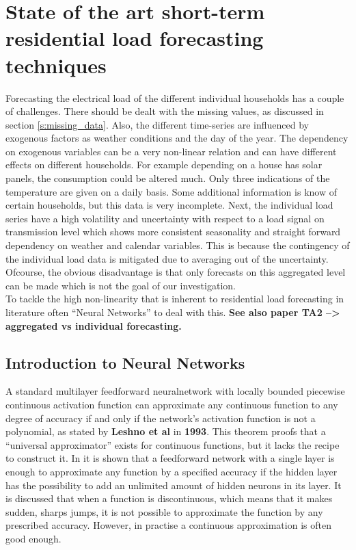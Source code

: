 \chapter{State of the art short-term residential load forecasting techniques}
\label{cha:State of the art short-term residential load forecasting techniques}
Forecasting the electrical load of the different individual households has a couple of challenges. There should be dealt with the missing values, as discussed in section \ref{s:missing_data}. Also, the different time-series are influenced by exogenous factors as weather conditions and the day of the year. The dependency on exogenous variables can be a very non-linear relation and can have different effects on different households. For example depending on a house has solar panels, the consumption could be altered much. Only three indications of the temperature are given on a daily basis. Some additional information is know of certain households, but this data is very incomplete. Next, the individual load series have a high volatility and uncertainty with respect to a load signal on transmission level which shows more consistent seasonality and straight forward dependency on weather and calendar variables. This is because the contingency of the individual load data is mitigated due to averaging out of the uncertainty. Ofcourse, the obvious disadvantage is that only forecasts on this aggregated level can be made which is not the goal of our investigation.\\ To tackle the high non-linearity that is inherent to residential load forecasting in literature often ``Neural Networks'' to deal with this.
\textbf{See also paper TA2 --> aggregated vs individual forecasting.}

\section{Introduction to Neural Networks}
A  standard multilayer feedforward neuralnetwork with locally bounded piecewise continuous activation function can approximate any continuous function to any degree of accuracy if and only if the network's activation function is not a polynomial, as stated by \textbf{Leshno et al} in \textbf{1993}. This theorem proofs that a ``universal approximator'' exists for continuous functions, but it lacks the recipe to construct it. In \cite{Nielsen2015} it is shown that a feedforward network with a single layer is enough to approximate any function by a specified accuracy if the hidden layer has the possibility to add an unlimited amount of hidden neurons in its layer. It is discussed that when a function is discontinuous, which means that it makes sudden, sharps jumps, it is not possible to approximate the function by any prescribed accuracy. However, in practise a continuous approximation is often good enough.\\

